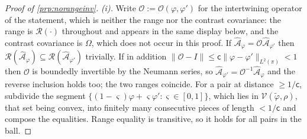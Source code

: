 \begin{proof}[Proof of \cref{prp:norangeinv}]
\emph{(i).} Write $\mathcal O:=\mathcal O(\varphi,\varphi')$ for the intertwining operator of the
statement, which is neither the range nor the contrast covariance: the range is $\mathcal R(\cdot)$
throughout and appears in the same display below, and the contrast covariance is $\Omega$, which does
not occur in this proof.
If $\hat{\mathcal A}_\varphi=\mathcal O\hat{\mathcal A}_{\varphi'}$ then
$\mathcal R(\hat{\mathcal A}_\varphi)\subseteq\mathcal R(\hat{\mathcal A}_{\varphi'})$ trivially. If in
addition $\|\mathcal O-I\|\le\mathsf c\|\varphi-\varphi'\|_{L^{2}(\pi)}<1$ then $\mathcal O$ is
boundedly invertible by the Neumann series, so
$\hat{\mathcal A}_{\varphi'}=\mathcal O^{-1}\hat{\mathcal A}_\varphi$ and the reverse inclusion
holds too; the two ranges coincide. For a pair at distance $\ge1/\mathsf c$, subdivide the segment
$\{(1-\varsigma)\varphi+\varsigma\varphi':\varsigma\in[0,1]\}$, which lies in
$\mathcal V(\tilde\varphi,\rho)$, that set being convex, into finitely many consecutive pieces of
length $<1/\mathsf c$ and compose the equalities. Range equality is transitive, so it holds for all
pairs in the ball.


\end{proof}
